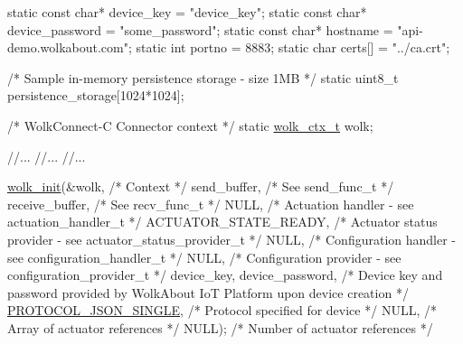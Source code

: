 \begin{DoxyCode}
\textcolor{keyword}{static} \textcolor{keyword}{const} \textcolor{keywordtype}{char}* device\_key = \textcolor{stringliteral}{"device\_key"};
\textcolor{keyword}{static} \textcolor{keyword}{const} \textcolor{keywordtype}{char}* device\_password = \textcolor{stringliteral}{"some\_password"};
\textcolor{keyword}{static} \textcolor{keyword}{const} \textcolor{keywordtype}{char}* hostname = \textcolor{stringliteral}{"api-demo.wolkabout.com"};
\textcolor{keyword}{static} \textcolor{keywordtype}{int} portno = 8883;
\textcolor{keyword}{static} \textcolor{keywordtype}{char} certs[] = \textcolor{stringliteral}{"../ca.crt"};

\textcolor{comment}{/* Sample in-memory persistence storage - size 1MB */}
\textcolor{keyword}{static} uint8\_t persistence\_storage[1024*1024];

\textcolor{comment}{/* WolkConnect-C Connector context */}
\textcolor{keyword}{static} \hyperlink{structwolk__ctx}{wolk\_ctx\_t} wolk;

\textcolor{comment}{//...}
\textcolor{comment}{//...}
\textcolor{comment}{//...}

\hyperlink{wolk__connector_8h_a607b5439ae7741284a73312b7794fa7a}{wolk\_init}(&wolk,                                             \textcolor{comment}{/* Context */}
          send\_buffer,                                       \textcolor{comment}{/* See send\_func\_t */}
          receive\_buffer,                                    \textcolor{comment}{/* See recv\_func\_t */}
          NULL,                                              \textcolor{comment}{/* Actuation handler        - see
       actuation\_handler\_t */}
          ACTUATOR\_STATE\_READY,                              \textcolor{comment}{/* Actuator status provider - see
       actuator\_status\_provider\_t */}
      NULL,                                              \textcolor{comment}{/* Configuration handler        - see
       configuration\_handler\_t */}
      NULL,                                              \textcolor{comment}{/* Configuration provider - see
       configuration\_provider\_t */}
          device\_key, device\_password,                       \textcolor{comment}{/* Device key and password provided by
       WolkAbout IoT Platform upon device creation */}
          \hyperlink{wolk__connector_8h_a91e19fa4fff461493e1a41f7c7aa4e5fa9574b7cae2523f47c59e082e473223bd}{PROTOCOL\_JSON\_SINGLE},                              \textcolor{comment}{/* Protocol specified for
       device */}
          NULL,                                              \textcolor{comment}{/* Array of actuator references */}
          NULL);                                             \textcolor{comment}{/* Number of actuator references */}


\end{DoxyCode}
